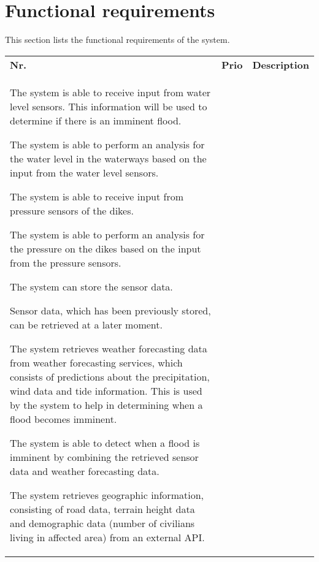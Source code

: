 \newpage
\section{Functional requirements}
This section lists the functional requirements of the system.
\begin{longtable}{L{0.1\textwidth} L{0.12\textwidth} L{0.78\textwidth}}

    \textbf{Nr.} & \textbf{Prio}  & \textbf{Description} \\
    
    {The system is able to receive input from water level sensors. This information will be used to determine if there is an imminent flood.}
    
    { The system is able to perform an analysis for the water level in the waterways based on the input from the water level sensors. }
    
	{The system is able to receive input from pressure sensors of the dikes.}
	
	{The system is able to perform an analysis for the pressure on the dikes based on the input from the pressure sensors.}
	
	{ The system can store the sensor data. }
	
	{ Sensor data, which has been previously stored, can be retrieved at a later moment. }

    {The system retrieves weather forecasting data from weather forecasting services, which consists of predictions about the precipitation, wind data and tide information. This is used by the system to help in determining when a flood becomes imminent.}
     
    { The system is able to detect when a flood is imminent by combining the retrieved sensor data and weather forecasting data. }
    
    { The system retrieves geographic information, consisting of road data, terrain height data and demographic data (number of civilians living in affected area) from an external API.}
        

\end{longtable}
